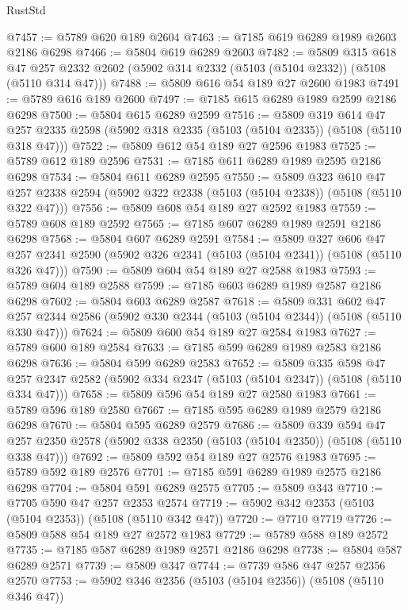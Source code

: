 \begin{lexlean}{RustStd}
\begin{coremodule}
@7457 := @5789 @620 @189 @2604
@7463 := @7185 @619 @6289 @1989 @2603 @2186 @6298
@7466 := @5804 @619 @6289 @2603
@7482 := @5809
    @315
    @618
    @47
    @257
    @2332
    @2602
    (@5902 @314 @2332 (@5103 (@5104 @2332)) (@5108 (@5110 @314 @47)))
@7488 := @5809 @616 @54 @189 @27 @2600 @1983
@7491 := @5789 @616 @189 @2600
@7497 := @7185 @615 @6289 @1989 @2599 @2186 @6298
@7500 := @5804 @615 @6289 @2599
@7516 := @5809
    @319
    @614
    @47
    @257
    @2335
    @2598
    (@5902 @318 @2335 (@5103 (@5104 @2335)) (@5108 (@5110 @318 @47)))
@7522 := @5809 @612 @54 @189 @27 @2596 @1983
@7525 := @5789 @612 @189 @2596
@7531 := @7185 @611 @6289 @1989 @2595 @2186 @6298
@7534 := @5804 @611 @6289 @2595
@7550 := @5809
    @323
    @610
    @47
    @257
    @2338
    @2594
    (@5902 @322 @2338 (@5103 (@5104 @2338)) (@5108 (@5110 @322 @47)))
@7556 := @5809 @608 @54 @189 @27 @2592 @1983
@7559 := @5789 @608 @189 @2592
@7565 := @7185 @607 @6289 @1989 @2591 @2186 @6298
@7568 := @5804 @607 @6289 @2591
@7584 := @5809
    @327
    @606
    @47
    @257
    @2341
    @2590
    (@5902 @326 @2341 (@5103 (@5104 @2341)) (@5108 (@5110 @326 @47)))
@7590 := @5809 @604 @54 @189 @27 @2588 @1983
@7593 := @5789 @604 @189 @2588
@7599 := @7185 @603 @6289 @1989 @2587 @2186 @6298
@7602 := @5804 @603 @6289 @2587
@7618 := @5809
    @331
    @602
    @47
    @257
    @2344
    @2586
    (@5902 @330 @2344 (@5103 (@5104 @2344)) (@5108 (@5110 @330 @47)))
@7624 := @5809 @600 @54 @189 @27 @2584 @1983
@7627 := @5789 @600 @189 @2584
@7633 := @7185 @599 @6289 @1989 @2583 @2186 @6298
@7636 := @5804 @599 @6289 @2583
@7652 := @5809
    @335
    @598
    @47
    @257
    @2347
    @2582
    (@5902 @334 @2347 (@5103 (@5104 @2347)) (@5108 (@5110 @334 @47)))
@7658 := @5809 @596 @54 @189 @27 @2580 @1983
@7661 := @5789 @596 @189 @2580
@7667 := @7185 @595 @6289 @1989 @2579 @2186 @6298
@7670 := @5804 @595 @6289 @2579
@7686 := @5809
    @339
    @594
    @47
    @257
    @2350
    @2578
    (@5902 @338 @2350 (@5103 (@5104 @2350)) (@5108 (@5110 @338 @47)))
@7692 := @5809 @592 @54 @189 @27 @2576 @1983
@7695 := @5789 @592 @189 @2576
@7701 := @7185 @591 @6289 @1989 @2575 @2186 @6298
@7704 := @5804 @591 @6289 @2575
@7705 := @5809 @343
@7710 := @7705 @590 @47 @257 @2353 @2574
@7719 := @5902 @342 @2353 (@5103 (@5104 @2353)) (@5108 (@5110 @342 @47))
@7720 := @7710 @7719
@7726 := @5809 @588 @54 @189 @27 @2572 @1983
@7729 := @5789 @588 @189 @2572
@7735 := @7185 @587 @6289 @1989 @2571 @2186 @6298
@7738 := @5804 @587 @6289 @2571
@7739 := @5809 @347
@7744 := @7739 @586 @47 @257 @2356 @2570
@7753 := @5902 @346 @2356 (@5103 (@5104 @2356)) (@5108 (@5110 @346 @47))

\end{coremodule}
\end{lexlean}
